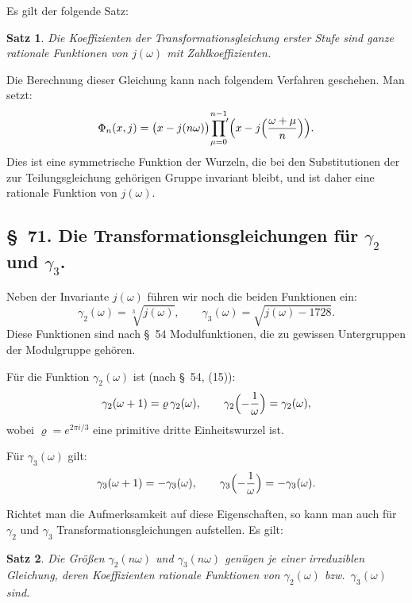 \documentclass[11pt,a4paper]{article}
\theoremstyle{plain}
\newtheorem*{satz}{Satz}
\theoremstyle{remark}
\begin{document}
Es gilt der folgende Satz:
\begin{satz}
Die Koeffizienten der Transformationsgleichung erster Stufe
sind ganze rationale Funktionen von $j(\omega)$ mit
Zahlkoeffizienten.
\end{satz}

Die Berechnung dieser Gleichung kann nach folgendem Verfahren
geschehen. Man setzt:
\begin{equation}\label{eq:70:3}
\Phi_n(x,j) = \bigl(x-j(n\omega)\bigr)
\sideset{}{'}\prod_{\mu=0}^{n-1}
\Bigl(x-j\Bigl(\frac{\omega+\mu}{n}\Bigr)\Bigr).
\end{equation}
Dies ist eine symmetrische Funktion der Wurzeln, die bei
den Substitutionen der zur Teilungsgleichung gehörigen Gruppe
invariant bleibt, und ist daher eine rationale Funktion
von $j(\omega)$.


\subsection*{§~71. Die Transformationsgleichungen für $\gamma_2$ und $\gamma_3$.}

Neben der Invariante $j(\omega)$ führen wir noch die beiden
Funktionen ein:
\begin{equation}\label{eq:71:1}
\gamma_2(\omega) = \sqrt[3]{j(\omega)},\qquad
\gamma_3(\omega) = \sqrt{j(\omega)-1728}.
\end{equation}
Diese Funktionen sind nach §~54 Modulfunktionen, die zu
gewissen Untergruppen der Modulgruppe gehören.

Für die Funktion $\gamma_2(\omega)$ ist (nach §~54, (15)):
\begin{equation}\label{eq:71:2}
\gamma_2(\omega+1) = \varrho\,\gamma_2(\omega),\qquad
\gamma_2\Bigl(-\frac{1}{\omega}\Bigr) = \gamma_2(\omega),
\end{equation}
wobei $\varrho=e^{2\pi i/3}$ eine primitive dritte Einheitswurzel
ist.

Für $\gamma_3(\omega)$ gilt:
\begin{equation}\label{eq:71:3}
\gamma_3(\omega+1) = -\gamma_3(\omega),\qquad
\gamma_3\Bigl(-\frac{1}{\omega}\Bigr) = -\gamma_3(\omega).
\end{equation}

Richtet man die Aufmerksamkeit auf diese Eigenschaften, so
kann man auch für $\gamma_2$ und $\gamma_3$ Transformationsgleichungen
aufstellen. Es gilt:
\begin{satz}
Die Größen $\gamma_2(n\omega)$ und $\gamma_3(n\omega)$ genügen
je einer irreduziblen Gleichung, deren Koeffizienten rationale
Funktionen von $\gamma_2(\omega)$ bzw.\ $\gamma_3(\omega)$ sind.
\end{satz}
\end{document}
